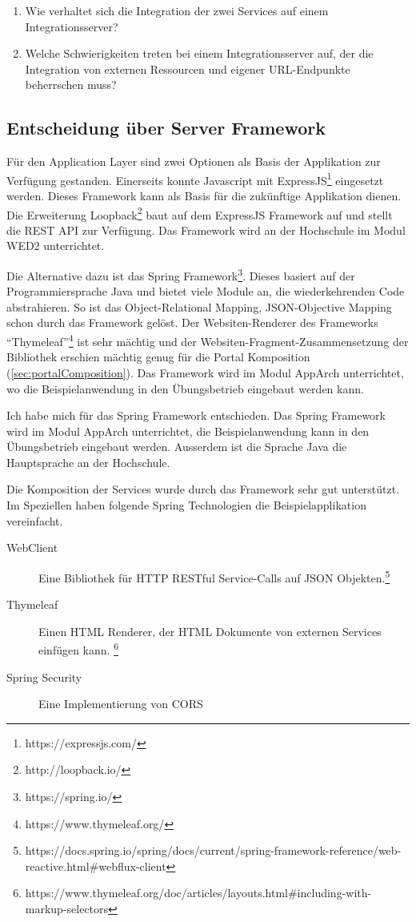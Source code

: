 \begin{enumerate}
    \item Wie verhaltet sich die Integration der zwei Services auf einem Integrationsserver?
    \item Welche Schwierigkeiten treten bei einem Integrationsserver auf, der die Integration von externen Ressourcen und eigener URL-Endpunkte beherrschen muss?
\end{enumerate}

\subsection{Entscheidung über Server Framework}

Für den  Application Layer sind zwei Optionen als Basis der Applikation zur Verfügung gestanden. Einerseits konnte Javascript mit ExpressJS\footnote{https://expressjs.com/} eingesetzt werden. Dieses Framework kann als Basis für die zukünftige Applikation dienen. Die Erweiterung Loopback\footnote{http://loopback.io/} baut auf dem ExpressJS Framework auf und stellt die REST API zur Verfügung. Das Framework wird an der Hochschule im Modul WED2 unterrichtet.

Die  Alternative dazu ist das Spring Framework\footnote{https://spring.io/}. Dieses basiert auf der Programmiersprache Java und bietet viele Module an, die wiederkehrenden Code abstrahieren. So ist das Object-Relational Mapping, JSON-Objective Mapping schon durch das Framework gelöst. Der Websiten-Renderer des Frameworks \enquote{Thymeleaf}\footnote{https://www.thymeleaf.org/} ist sehr mächtig und der Websiten-Fragment-Zusammensetzung der Bibliothek erschien mächtig genug für die Portal Komposition (\ref{sec:portalComposition}). Das Framework wird im Modul AppArch unterrichtet, wo die Beispielanwendung in den Übungsbetrieb eingebaut werden kann.

Ich  habe mich für das Spring Framework entschieden. Das Spring Framework wird im Modul AppArch unterrichtet, die Beispielanwendung kann in den Übungsbetrieb eingebaut werden. Ausserdem ist die Sprache Java die Hauptsprache an der Hochschule.

Die  Komposition der Services wurde durch das Framework sehr gut unterstützt. Im Speziellen haben folgende Spring Technologien die Beispielapplikation vereinfacht.

\begin{description}
    \item[WebClient] Eine Bibliothek für HTTP RESTful Service-Calls auf JSON Objekten.\footnote{https://docs.spring.io/spring/docs/current/spring-framework-reference/web-reactive.html\#webflux-client}
    \item[Thymeleaf] Einen HTML Renderer, der HTML Dokumente von externen Services einfügen kann. \footnote{https://www.thymeleaf.org/doc/articles/layouts.html\#including-with-markup-selectors}
    \item[Spring Security] Eine Implementierung von \ac{CORS}
\end{description}

